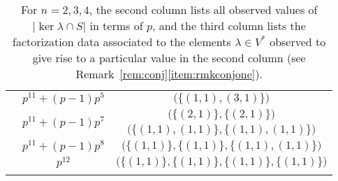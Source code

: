 \begin{table}[h]
\begin{tabular}{ccc}
\cmidrule(l){2-3}
&$p^{11}+(p-1)p^5$&$\big(\big\{(1,1),(3,1)\big\}\big)$\\
\cmidrule(l){2-3}
&\multirow{2}{*}{$p^{11}+(p-1)p^7$}&$\big(\big\{(2,1)\big\},\big\{(2,1)\big\}\big)$\\
&&$\big(\big\{(1,1),(1,1)\big\},\big\{(1,1),(1,1)\big\}\big)$\\
\cmidrule(l){2-3}
&$p^{11}+(p-1)p^8$&$\big(\big\{(1,1)\big\},\big\{(1,1)\big\},\big\{(1,1),(1,1)\big\}\big)$\\
\cmidrule(l){2-3}
&$p^{12}$&$\big(\big\{(1,1)\big\},\big\{(1,1)\big\},\big\{(1,1)\big\},\big\{(1,1)\big\}\big)$\\
\bottomrule\\
\end{tabular}
\caption{For $n=2,3,4$, the second column lists all observed values of $|\ker\lambda\cap S|$ in terms of $p$, and the third column lists the factorization data associated to the elements $\lambda\in V^*$ observed to give rise to a particular value in the second column (see Remark~\ref{rem:conj}\eqref{item:rmkconjone}).}
\label{tab:lowdim}
\end{table}

